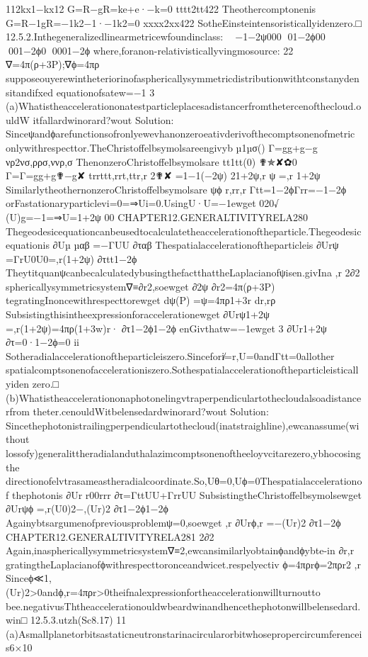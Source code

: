 {{{{{{{{{{{{{{{{112kx1−kx12
G=R−gR=ke+e·−k=0
tttt2tt422
Theothercomptonenis
G=R−1gR=−1k2−1·−1k2=0
xxxx2xx422
SotheEinsteintensoristicallyidenzero.□
12.5.2.Inthegeneralizedlinearmetricewfoundinclass:

−1−2ψ000
01−2ϕ00

001−2ϕ0
0001−2ϕ
where,foranon-relativisticallyvingmosource:
22
∇=4π(ρ+3P);∇ϕ=4πρ
supposeouyerewintheteriorinofasphericallysymmetricdistributionwithtconstanydensitandifxed
equationofsatew=−1
3
(a)Whatistheaccelerationonatestparticleplacesadistancerfromthetercenofthecloud.ouldW
itfallardwinorard?wout
Solution:
Sinceψandϕarefunctionsofronlyewevhanonzeroeativderivofthecomptsonenofmetric
onlywithrespecttor.TheChristoffelbsymolsareengivyb
µ1µσ()
Γ=gg+g−g
νρ2νσ,ρρσ,ννρ,σ
ThenonzeroChristoffelbsymolsare
tt1tt(0)
✟✯✘✿0
Γ=Γ=gg+g✟−g✘
trrttt,rrt,ttr,r
2✟✘
=1−1(−2ψ)
21+2ψ,r
ψ
=,r
1+2ψ
SimilarlytheothernonzeroChristoffelbsymolsare
ψϕ
r,rr,r
Γtt=1−2ϕΓrr=−1−2ϕ
orFastationaryparticlevi=0=⇒Ui=0.UsingU·U=−1ewget
020√
(U)g=−1=⇒U=1+2ψ
00
CHAPTER12.GENERALTIVITYRELA280
Thegeodesicequationcanbeusedtocalculatetheaccelerationoftheparticle.Thegeodesic
equationis
∂Uµ
µαβ
=−ΓUU
∂ταβ
Thespatialaccelerationoftheparticleis
∂Urψ
=ΓrU0U0=,r(1+2ψ)
∂τtt1−2ϕ
TheytitquanψcanbecalculatedybusingthefactthattheLaplacianofψisen.givIna
,r
2∂2
sphericallysymmetricsystem∇≡∂r2,soewget
∂2ψ
∂r2=4π(ρ+3P)
tegratingInoncewithrespecttorewget
dψ(P)
=ψ=4πρ1+3r
dr,rρ
Subsistingthisintheexpressionforaccelerationewget
∂Urψ1+2ψ
=,r(1+2ψ)=4πρ(1+3w)r·
∂τ1−2ϕ1−2ϕ
enGivthatw=−1ewget
3
∂Ur1+2ψ
∂τ=0·1−2ϕ=0
ii
Sotheradialaccelerationoftheparticleiszero.Sincefori̸=r,U=0andΓtt=0allother
spatialcomptsonenofaccelerationiszero.Sothespatialaccelerationoftheparticleisticallyiden
zero.□
(b)Whatistheaccelerationonaphotonelingvtraperpendiculartothecloudalsoadistancerfrom
theter.cenouldWitbelensedardwinorard?wout
Solution:
Sincethephotonistrailingperpendiculartothecloud(inatstraighline),ewcanassume(without
lossofy)generalittheradialanduthalazimcomptsonenoftheeloyvcitarezero,ybhocosingthe
directionofelvtrasameastheradialcoordinate.So,Uθ=0,Uϕ=0Thespatialaccelerationof
thephotonis
∂Ur
r00rrr
∂τ=ΓttUU+ΓrrUU
SubsistingtheChristoffelbsymolsewget
∂Urψϕ
=,r(U0)2−,(Ur)2
∂τ1−2ϕ1−2ϕ
Againybtsargumenofpreviousproblemψ=0,soewget
,r
∂Urϕ,r
=−(Ur)2
∂τ1−2ϕ
CHAPTER12.GENERALTIVITYRELA281
2∂2
Again,inasphericallysymmetricsystem∇≡2,ewcansimilarlyobtainϕandϕybte-in
∂r,r
gratingtheLaplacianofϕwithrespecttoronceandwicet.respelyectiv
ϕ=4πρrϕ=2πρr2
,r
Sinceϕ≪1,(Ur)2>0andϕ,r=4πρr>0theifnalexpressionfortheaccelerationwillturnoutto
bee.negativusThtheaccelerationouldwbeardwinandhencethephotonwillbelensedard.win□
12.5.3.utzh(Sc8.17)
11
(a)Asmallplanetorbitsastaticneutronstarinacircularorbitwhosepropercircumferenceis6×10
}}}}}}}}}}}}}}}}
